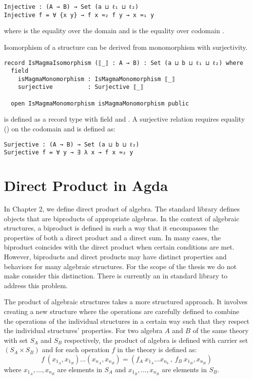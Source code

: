 \begin{verbatim}
Injective : (A → B) → Set (a ⊔ ℓ₁ ⊔ ℓ₂)
Injective f = ∀ {x y} → f x ≈₂ f y → x ≈₁ y
\end{verbatim}

where  is the equality over the domain  and 
is the equality over codomain .

Isomorphism of a structure can be derived from monomorphism with surjectivity.

\begin{verbatim}
record IsMagmaIsomorphism (⟦_⟧ : A → B) : Set (a ⊔ b ⊔ ℓ₁ ⊔ ℓ₂) where
  field
    isMagmaMonomorphism : IsMagmaMonomorphism ⟦_⟧
    surjective          : Surjective ⟦_⟧

  open IsMagmaMonomorphism isMagmaMonomorphism public
\end{verbatim} 

 is defined as a record type with field
 and . A surjective relation
requires equality () on the codomain  and is defined as:

\begin{verbatim}
Surjective : (A → B) → Set (a ⊔ b ⊔ ℓ₂)
Surjective f = ∀ y → ∃ λ x → f x ≈₂ y
\end{verbatim}

\section{Direct Product in Agda}
In Chapter 2, we define direct product of algebra. The standard library defines
objects that are biproducts of appropriate algebras. In the context of algebraic
structures, a biproduct is defined in such a way that it encompasses the
properties of both a direct product and a direct sum. In many cases, the
biproduct coincides with the direct product when certain conditions are met.
However, biproducts and direct products may have distinct properties and
behaviors for many algebraic structures. For the scope of the thesis we do not
make consider this distinction. There is currently an
 in standard
library to address this problem. 

The product of algebraic structures takes a more structured approach. It
involves creating a new structure where the operations are carefully defined to
combine the operations of the individual structures in a certain way such that
they respect the individual structures' properties. For two algebra $A$ and $B$
of the same theory with set $S_A$ and $S_B$ respectively, the product of algebra
is defined with carrier set $(S_A \times S_B)$ and for each operation $f$ in the
theory is defined as:
\[f\ (x_{1_A},x_{1_B})...(x_{n_A},x_{n_B}) = (f_A\ x_{1_A}...x_{n_b}\ ,\ f_B\
x_{1_B},x_{n_B} )\] where $x_{1_A},...,x_{n_B}$ are elements in $S_A$ and
$x_{1_B},...,x_{n_B}$ are elements in $S_B$. 

